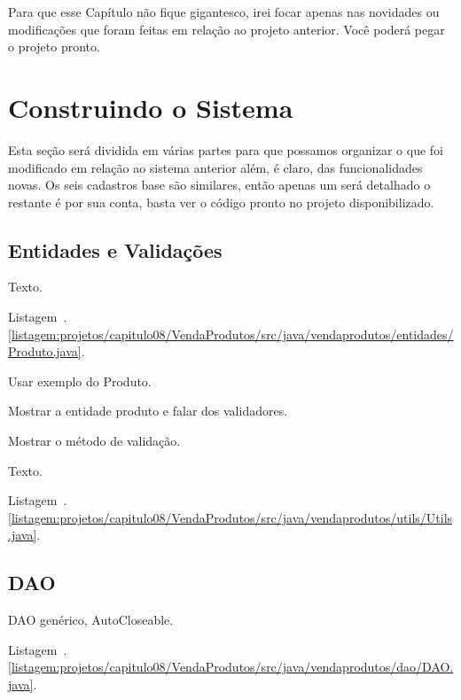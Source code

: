 Para que esse Capítulo não fique gigantesco, irei focar apenas nas novidades ou modificações que foram feitas em relação ao projeto anterior. Você poderá pegar o projeto pronto.


\section{Construindo o Sistema}

Esta seção será dividida em várias partes para que possamos organizar o que foi modificado em relação ao sistema anterior além, é claro, das funcionalidades novas. Os seis cadastros base são similares, então apenas um será detalhado o restante é por sua conta, basta ver o código pronto no projeto disponibilizado.


\subsection{Entidades e Validações}

Texto.

Listagem~\thechapter.\ref{listagem:projetos/capitulo08/VendaProdutos/src/java/vendaprodutos/entidades/Produto.java}.


Usar exemplo do Produto.

Mostrar a entidade produto e falar dos validadores.

Mostrar o método de validação.

Texto.

Listagem~\thechapter.\ref{listagem:projetos/capitulo08/VendaProdutos/src/java/vendaprodutos/utils/Utils.java}.



\subsection{DAO}

DAO genérico, AutoCloseable.

Listagem~\thechapter.\ref{listagem:projetos/capitulo08/VendaProdutos/src/java/vendaprodutos/dao/DAO.java}.

